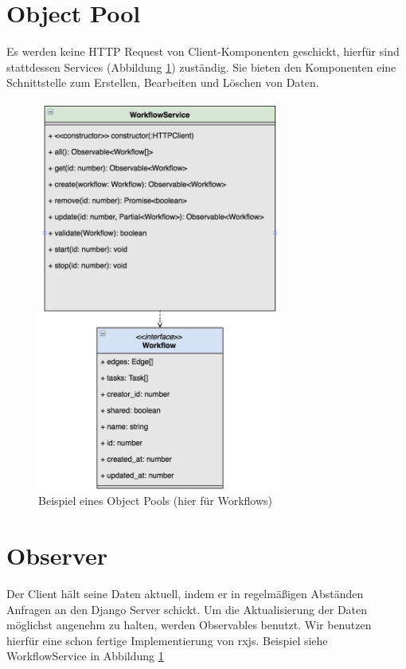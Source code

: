     \section{Object Pool}
    Es werden keine HTTP Request von Client-Komponenten geschickt, hierfür sind stattdessen Services (Abbildung \ref{fig:pattern_pool_diagramm}) zuständig. Sie bieten den Komponenten eine Schnittstelle zum Erstellen, Bearbeiten und Löschen von Daten.
    
     \begin{figure}[h]
        \centering
        \includegraphics[width=8cm]{diagrams/pattern_pool.png}
        \caption{Beispiel eines Object Pools (hier für Workflows)}
        \label{fig:pattern_pool_diagramm}
    \end{figure}
    
    \section{Observer}
    Der Client hält seine Daten aktuell, indem er in regelmäßigen Abständen Anfragen an den Django Server schickt. Um die Aktualisierung der Daten möglichst angenehm zu halten, werden Observables benutzt. Wir benutzen hierfür eine schon fertige Implementierung von rxjs.
    Beispiel siehe WorkflowService in Abbildung \ref{fig:pattern_pool_diagramm}
	